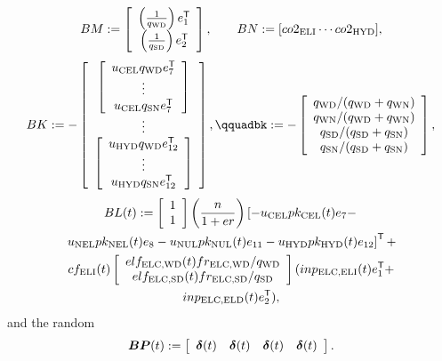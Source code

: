 \[
BM:=\left[\begin{array}{c}\left(\frac{1}{q_{\text{WD}}}\right)e_{1}^{\mbox{\scriptsize\sf T}}\\
\left(\frac{1}{q_{\text{SD}}}\right)e_{2}^{\mbox{\scriptsize\sf T}}\end{array}\right],\qquad
BN:=[co2_{\text{ELI}}\cdots co2_{\text{HYD}}],
\]
\[
BK\assign -\left[\ajfbox{\left[\ajfbox{u_{\text{CEL}}q_{\text{WD}}e_{7}\trp\\
\vdots\\
u_{\text{CEL}}q_{\text{SN}}e_{7}\trp}\right]\\ \vdots\\ 
\left[\ajfbox{u_{\text{HYD}}q_{\text{WD}}e_{12}\trp\\
\vdots\\
u_{\text{HYD}}q_{\text{SN}}e_{12}\trp}\right]}\right], \qquad%
bk\assign -\left[\ajfbox{q_{\text{WD}}/(q_{\text{WD}}+q_{\text{WN}})\\
q_{\text{WN}}/(q_{\text{WD}}+q_{\text{WN}})\\ 
q_{\text{SD}}/(q_{\text{SD}}+q_{\text{SN}})\\
q_{\text{SN}}/(q_{\text{SD}}+q_{\text{SN}})\\
}\right],
\]
\begin{multline*}
BL(t):=\left[\begin{array}{c}1\\1\end{array}\right]\left(\frac{n}{1+er}\right)\left[-u_{\text{CEL}}pk_{\text{CEL}}(t)e_{7} -\right.\\ 
\left.u_{\text{NEL}}pk_{\text{NEL}}(t)e_{8} -u_{\text{NUL}}pk_{\text{NUL}}(t)e_{11} -u_{\text{HYD}}pk_{\text{HYD}}(t)e_{12} \right]^{\mbox{\scriptsize\sf T}} +\\
cf_{\text{ELI}}(t)\left[\begin{array}{c}elf_{\text{ELC,WD}}(t)fr_{\text{ELC,WD}}/q_{\text{WD}}\\
elf_{\text{ELC,SD}}(t)fr_{\text{ELC,SD}}/q_{\text{SD}}\end{array}\right](inp_{\text{ELC,ELI}}(t)e_{1}^{\mbox{\scriptsize\sf T}} + \\inp_{\text{ELC,ELD}}(t)e_{2}^{\mbox{\scriptsize\sf T}}),
\end{multline*}
and the random
\[
\mathbf{\boldsymbol{BP}}(t):=\left[\begin{array}{cccc}\mathbf{\boldsymbol{\delta}}(t) & \mathbf{\boldsymbol{\delta}}(t) & \mathbf{\boldsymbol{\delta}}(t) & \mathbf{\boldsymbol{\delta}}(t)\end{array}\right].
\]

